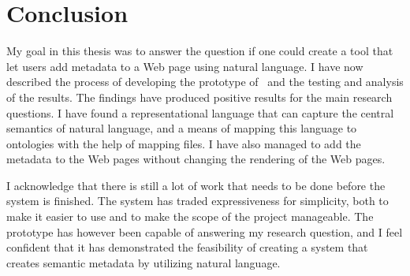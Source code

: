 \section{Conclusion}
My goal in this thesis was to answer the question if one could create a tool that let users add metadata to a Web page using
natural language.
I have now described the process of developing the prototype of \theartefact\ and the testing and analysis of the results.
The findings have produced positive results for the main research questions.
I have found a representational language that can capture the central semantics of natural language,
and a means of mapping this language to ontologies with the help of mapping files.
I have also managed to add the metadata to the Web pages without changing the rendering of the Web pages.

I acknowledge that there is still a lot of work that needs to be done before the system is finished.
The system has traded expressiveness for simplicity, both to make it easier to use and to make the scope of the project manageable.
The prototype has however been capable of answering my research question,
and I feel confident that it has demonstrated the feasibility of creating a system that creates semantic metadata by
utilizing natural language.
